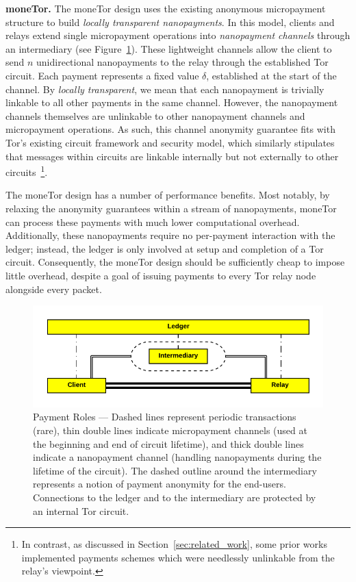 \medskip \noindent\textbf{moneTor.} The moneTor design uses the existing anonymous micropayment structure to build \emph{locally transparent nanopayments}.
In this model, clients and relays extend single micropayment operations into \emph{nanopayment channels} through an intermediary (see Figure~\ref{fig:parties}).
These lightweight channels allow the client to send $n$ unidirectional nanopayments to the relay through the established Tor circuit.
Each payment represents a fixed value $\delta$, established at the start of the channel.
By \emph{locally transparent}, we mean that each nanopayment is trivially linkable to all other payments in the same channel.
However, the nanopayment channels themselves are unlinkable to other nanopayment channels and micropayment operations.
As such, this channel anonymity guarantee fits with Tor's existing circuit framework and security model, which similarly stipulates that messages within circuits are linkable internally but not externally to other circuits~\footnote{In contrast, as discussed in Section~\ref{sec:related_work}, some prior works implemented payments schemes which were needlessly unlinkable from the relay's viewpoint.}.

The moneTor design has a number of performance benefits.
Most notably, by relaxing the anonymity guarantees within a stream of nanopayments, moneTor can process these payments with much lower computational overhead.
Additionally, these nanopayments require no per-payment interaction with the ledger; instead, the ledger is only involved at setup and completion of a Tor circuit.
Consequently, the moneTor design should be sufficiently cheap to impose little overhead, despite a goal of issuing payments to every Tor relay node alongside every packet.

\begin{figure}[h] \centering
  \includegraphics[trim={0.5cm, 0.5cm, 0.5cm, 0.5cm}, clip,
    scale=0.6]{images/party_diagram.pdf}
  \caption[Payment Roles]{Payment Roles --- Dashed lines represent periodic transactions (rare), thin double lines indicate micropayment channels (used at the beginning and end of circuit lifetime), and thick double lines indicate a nanopayment channel (handling nanopayments during the lifetime of the circuit).
    The dashed outline around the intermediary represents a notion of payment anonymity for the end-users.
    Connections to the ledger and to the intermediary are protected by an internal Tor circuit.}
  \label{fig:parties}
\end{figure}

